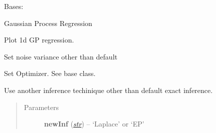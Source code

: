 \documentclass[letterpaper,10pt,english]{sphinxmanual}
\begin{document}
\begin{fulllineitems}
\label{pyGPs.Core:pyGPs.Core.gp.GPR}
Bases: {\hyperref[pyGPs.Core:pyGPs.Core.gp.GP]{}}

Gaussian Process Regression

\begin{fulllineitems}
\label{pyGPs.Core:pyGPs.Core.gp.GPR.plot}
Plot 1d GP regression.

\end{fulllineitems}


\begin{fulllineitems}
\label{pyGPs.Core:pyGPs.Core.gp.GPR.setNoise}
Set noise variance other than default

\end{fulllineitems}


\begin{fulllineitems}
\label{pyGPs.Core:pyGPs.Core.gp.GPR.setOptimizer}
Set Optimizer. See base class.

\end{fulllineitems}


\begin{fulllineitems}
\label{pyGPs.Core:pyGPs.Core.gp.GPR.useInference}
Use another inference techinique other than default exact inference.
\begin{quote}\begin{description}
\item[{Parameters}] \leavevmode
\textbf{newInf} (\href{http://docs.python.org/library/functions.html\#str}{\emph{str}}) -- `Laplace' or `EP'

\end{description}\end{quote}

\end{fulllineitems}


\begin{fulllineitems}
\label{pyGPs.Core:pyGPs.Core.gp.GPR.useLikelihood}
\end{fulllineitems}


\end{fulllineitems}
\end{document}
